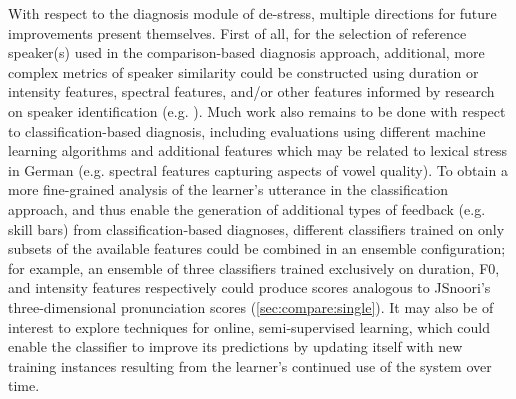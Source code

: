 	
	With respect to the diagnosis module of de-stress, multiple directions for future improvements present themselves. 
	First of all, for the selection of reference speaker(s) used in the comparison-based diagnosis approach, additional, more complex metrics of speaker similarity could be 
	constructed using duration or intensity features, spectral features, and/or other features informed by research on speaker identification (e.g. \cite{Shriberg2005}).
	Much work also remains to be done with respect to classification-based diagnosis, including evaluations using different machine learning algorithms and additional features which may be related to lexical stress in German (e.g. spectral features capturing aspects of vowel quality). To obtain a more fine-grained analysis of the learner's utterance in the classification approach, and thus enable the generation of additional types of feedback (e.g. skill bars) from classification-based diagnoses, different classifiers trained on only subsets of the available features could be combined in an ensemble configuration;
	for example, an ensemble of three classifiers trained exclusively on duration, F0, and intensity features respectively could produce scores analogous to JSnoori's three-dimensional pronunciation scores (\cref{sec:compare:single}).
	 It may also be of interest to explore techniques for online, semi-supervised learning, which could enable the classifier to improve its predictions by updating itself with new training instances resulting from the learner's continued use of the system over time.
	
